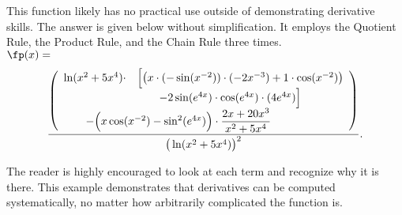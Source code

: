 {This function likely has no practical use outside of demonstrating derivative skills. The answer is given below without simplification. It employs the Quotient Rule, the Product Rule, and the Chain Rule three times.\\


\noindent $\fp(x) = $
\[
\frac{\left(\begin{array}{ll}\ln(x^2+5x^4)\cdot &\Big[\big(x\cdot(-\sin(x^{-2}))\cdot(-2x^{-3})+1\cdot \cos(x^{-2})\big)\\
&\quad\quad -2\sin(e^{4x})\cdot\cos(e^{4x})\cdot(4e^{4x})\Big]\\
\multicolumn{2}{l}{\qquad-\Big(x\cos(x^{-2})-\sin^2(e^{4x})\Big)\cdot\dfrac{2x+20x^3}{x^2+5x^4}}\end{array}\right)}{\big(\ln(x^2+5x^4)\big)^2}.
\]


The reader is highly encouraged to look at each term and recognize why it is there.   This example demonstrates that derivatives can be computed systematically, no matter how arbitrarily complicated the function is.
}\\

